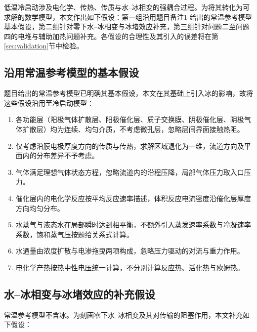 \documentclass{gmcmthesis}
\begin{document}
低温冷启动涉及电化学、传热、传质与水–冰相变的强耦合过程。为将其转化为可求解的数学模型，本文作出如下假设：第一组沿用题目备注1 给出的常温参考模型基本假设，第二组针对零下水–冰相变与冰堵效应补充，第三组针对问题二至问题四的电堆与辅助加热问题补充。各假设的合理性及其引入的误差将在第\ref{sec:validation}节中检验。

\subsection{沿用常温参考模型的基本假设}
题目给出的常温参考模型已明确其基本假设，本文在其基础上引入冰的影响，故将这些假设沿用至冷启动模型：

\begin{enumerate}
  \item 各功能层（阳极气体扩散层、阳极催化层、质子交换膜、阴极催化层、阴极气体扩散层）均为连续、均匀介质，不考虑微孔层，忽略层间界面接触热阻。
  \item 仅考虑沿膜电极厚度方向的传质与传热，求解区域退化为一维，流道方向及平面内的分布差异不予考虑。
  \item 气体满足理想气体状态方程，忽略流道内的沿程压降，局部气体压力取入口压力。
  \item 催化层内的电化学反应按平均反应速率描述，体积反应电流密度沿催化层厚度方向均匀分布。
  \item 水蒸气与液态水在局部瞬时达到相平衡，不额外引入蒸发速率系数与冷凝速率系数，饱和蒸气压按题给关系式计算。
  \item 水通量由浓度扩散与电渗拖曳两项构成，忽略压力驱动的对流与重力作用。
  \item 电化学产热按热中性电压统一计算，不分别计算反应热、活化热与欧姆热。
\end{enumerate}

\subsection{水–冰相变与冰堵效应的补充假设}
常温参考模型不含冰。为刻画零下水–冰相变及其对传输的阻塞作用，本文补充如下假设：
\end{document}
